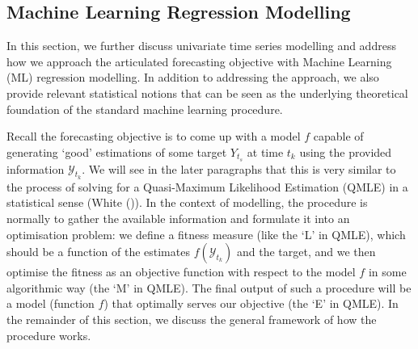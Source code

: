 \subsection{Machine Learning Regression Modelling}\label{subsec: ML modelling}
In this section, we further discuss univariate time series modelling and address how we approach the articulated forecasting objective with Machine Learning (ML) regression modelling. In addition to addressing the approach, we also provide relevant statistical notions that can be seen as the underlying theoretical foundation of the standard machine learning procedure.

Recall the forecasting objective is to come up with a model $f$ capable of generating `good' estimations of some target $Y_{t_s}$ at time $t_k$ using the provided information $\mathcal{Y}_{t_k}$. We will see in the later paragraphs that this is very similar to the process of solving for a Quasi-Maximum Likelihood Estimation (QMLE) in a statistical sense (White (\citeyear{white1982maximum})). In the context of modelling, the procedure is normally to gather the available information and formulate it into an optimisation problem: we define a fitness measure (like the `L' in QMLE), which should be a function of the estimates $f(\mathcal{Y}_{t_k})$ and the target, and we then optimise the fitness as an objective function with respect to the model $f$ in some algorithmic way (the `M' in QMLE). The final output of such a procedure will be a model (function $f$) that optimally serves our objective (the `E' in QMLE). In the remainder of this section, we discuss the general framework of how the procedure works.

